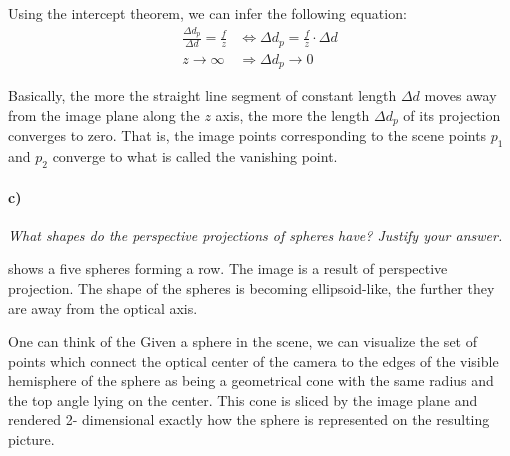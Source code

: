 \documentclass[a4paper,twocolumn]{article}
\newcommand{\subtask}[2]{\paragraph{#1)} \textit{#2} \newline}
\begin{document}
	Using the intercept theorem, we can infer the following equation:
	\begin{align*}
		\frac{\Delta d_p}{\Delta d} = \frac{f}{z} &\Leftrightarrow
		\Delta d_p = \frac{f}{z} \cdot \Delta d \\
		z \rightarrow \infty &\Rightarrow \Delta d_p \rightarrow 0
	\end{align*}
	
	Basically, the more the straight line segment of constant length $\Delta d$ moves away from the image plane along the $z$ axis, the more the length $\Delta d_p$ of its projection converges to zero. That is, the image points corresponding to the scene points $p_1$ and $p_2$ converge to what is called the vanishing point.


	
	
	
	\subtask{c}{What shapes do the perspective projections of spheres have? Justify your answer.}
	
	 shows a five spheres forming a row. The image is a result of perspective projection. The shape of the spheres is becoming ellipsoid-like, the further they are away from the optical axis.
	
	One can think of the 
	Given a sphere in the scene, we can visualize the set of points which connect the optical center of the camera to the edges of the visible hemisphere of the sphere as being a geometrical cone with the same radius and the top angle lying on the center. This cone is sliced by the image plane and rendered 2- dimensional exactly how the sphere is represented on the resulting picture.
	
\end{document}
